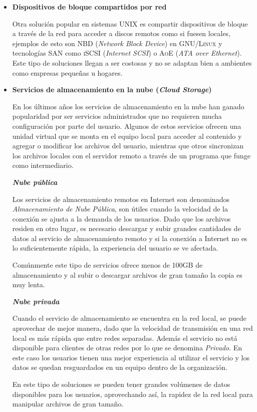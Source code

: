 \begin{itemize}
      \item \textbf{Dispositivos de bloque compartidos por red}

Otra soluci\'{o}n popular en sistemas \textsc{UNIX} es compartir dispositivos de bloque a trav\'{e}s de la red para acceder a discos remotos como si fuesen locales, ejemplos de esto son \textsc{NBD} (\textit{Network Block Device}) en \textsc{GNU/Linux} y tecnolog\'{i}as \textsc{SAN} como \textsc{iSCSI} (\textit{Internet SCSI}) o \textsc{AoE} (\textit{ATA over Ethernet}). Este tipo de soluciones llegan a ser costosas y no se adaptan bien a ambientes como empresas peque\~{n}as u hogares.

      \item \textbf{Servicios de almacenamiento en la nube (\emph{Cloud Storage})}

En los \'{u}ltimos a\~{n}os los servicios de almacenamiento en la nube han ganado popularidad por ser servicios administrados que no requieren mucha configuraci\'{o}n por parte del usuario. Algunos de estos servicios ofrecen una unidad virtual que se monta en el equipo local para acceder al contenido y agregar o modificar los archivos del usuario, mientras que otros sincronizan los archivos locales con el servidor remoto a trav\'{e}s de un programa que funge como intermediario.

        \textbf{\textsl{Nube p\'{u}blica}}

Los servicios de almacenamiento remotos en Internet son denominados \emph{Almacenamiento de Nube P\'{u}blica}, son \'{u}tiles cuando la velocidad de la conexi\'{o}n se ajusta a la demanda de los usuarios. Dado que los archivos residen en otro lugar, es necesario descargar y subir grandes cantidades de datos al servicio de almacenamiento remoto y si la conexi\'{o}n a Internet no es lo suficientemente r\'{a}pida, la experiencia del usuario se ve afectada.

Com\'{u}nmente este tipo de servicios ofrece menos de 100GB de almacenamiento y al subir o descargar archivos de gran tama\~{n}o la copia es muy lenta.

        \textbf{\textsl{Nube privada}}

Cuando el servicio de almacenamiento se encuentra en la red local, se puede aprovechar de mejor manera, dado que la velocidad de transmisi\'{o}n en una red local es m\'{a}s r\'{a}pida que entre redes separadas. Adem\'{a}s el servicio no est\'{a} disponible para clientes de otras redes por lo que se denomina \emph{Privado}. En este caso los usuarios tienen una mejor experiencia al utilizar el servicio y los datos se quedan resguardados en un equipo dentro de la organizaci\'{o}n.

En este tipo de soluciones se pueden tener grandes vol\'{u}menes de datos disponibles para los usuarios, aprovechando as\'{i}, la rapidez de la red local para manipular archivos de gran tama\~{n}o.

    \end{itemize}

